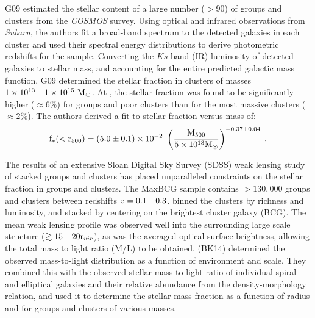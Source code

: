 G09 estimated the stellar content of a large number ($>90$) of
groups and clusters from the \textit{COSMOS} survey. Using optical and
infrared observations from \textit{Subaru}, the authors fit a
broad-band spectrum to the detected galaxies in each cluster and used
their spectral energy distributions to derive photometric redshifts
for the sample. Converting the $Ks$-band (IR) luminosity of detected
galaxies to stellar mass, and accounting for the entire predicted
galactic mass function, G09 determined the stellar fraction in
clusters of masses $1\times 10^{13}\;\textrm{--}\;1\times 10^{15}~\textrm{M}_\odot$. At \rfive{},
the stellar fraction was found to be significantly higher ($\approx
6\%$) for groups and poor clusters than for the most massive clusters
($\approx 2\%$). The authors derived a fit to stellar-fraction versus
mass of:
\begin{equation}
\textrm{f}_{*}(<\textrm{r\ensuremath{_{500}}}{}) =
(5.0\pm0.1)\times 10^{-2}~\left(\frac{\textrm{M\ensuremath{_{500}}}}{5\times 10^{13}\textrm{M}_\odot}\right)^{-0.37\pm0.04}
\;.
\end{equation}

The results of an extensive Sloan Digital Sky Survey (SDSS) weak
lensing study of stacked groups and clusters has placed unparalleled
constraints on the stellar fraction in groups and clusters. The MaxBCG
sample \citep{Sheldon2009a} contains $> 130,000$ groups and clusters
between redshifts $z = 0.1\;\textrm{--}\;0.3$. \citet{Sheldon2009b} binned the
clusters by richness and luminosity, and stacked by centering on the
brightest cluster galaxy (BCG). The mean weak lensing profile was
observed well into the surrounding large scale structure ($\gtrsim
15\;\textrm{--}\;20 \textrm{r\ensuremath{_{vir}}}$), as was the averaged optical surface brightness,
allowing the total mass to light ratio (M/L) to be
obtained. \textbf{\citet{Bahcall2014}} (BK14) determined the
observed mass-to-light distribution as a function of environment and
scale. They combined this with the observed stellar mass to light
ratio of individual spiral and elliptical galaxies and their relative
abundance from the density-morphology relation, and used it to
determine the stellar mass fraction as a function of radius and for
groups and clusters of various masses.

